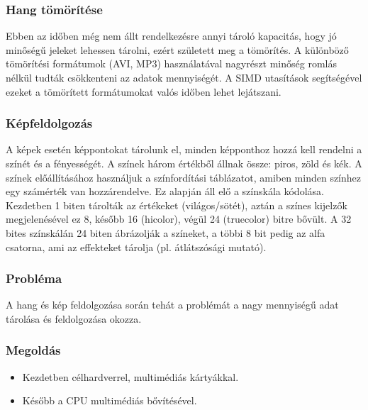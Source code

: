 \subsubsection{Hang tömörítése}
Ebben az időben még nem állt rendelkezésre annyi tároló kapacitás, hogy jó minőségű jeleket lehessen tárolni, ezért született meg a tömörítés.
A különböző tömörítési formátumok (AVI, MP3) használatával nagyrészt minőség romlás nélkül tudták csökkenteni az adatok mennyiségét.
A SIMD utasítások segítségével ezeket a tömörített formátumokat valós időben lehet lejátszani.
\subsubsection{Képfeldolgozás}
A képek esetén képpontokat tárolunk el, minden képponthoz hozzá kell rendelni a színét és a fényességét.
A színek három értékből állnak össze: piros, zöld és kék.
A színek előállításához használjuk a színfordítási táblázatot, amiben minden színhez egy számérték van hozzárendelve.
Ez alapján áll elő a színskála kódolása.
Kezdetben 1 biten tárolták az értékeket (világos/sötét), aztán a színes kijelzők megjelenésével ez 8, később 16 (hicolor), végül 24 (truecolor) bitre bővült.
A 32 bites színskálán 24 biten ábrázolják a színeket, a többi 8 bit pedig az alfa csatorna, ami az effekteket tárolja (pl. átlátszósági mutató).
\subsubsection{Probléma}
A hang és kép feldolgozása során tehát a problémát a nagy mennyiségű adat tárolása és feldolgozása okozza.
\subsubsection{Megoldás}
\begin{itemize}
    \item Kezdetben célhardverrel, multimédiás kártyákkal.
    \item Később a CPU multimédiás bővítésével.
\end{itemize}
